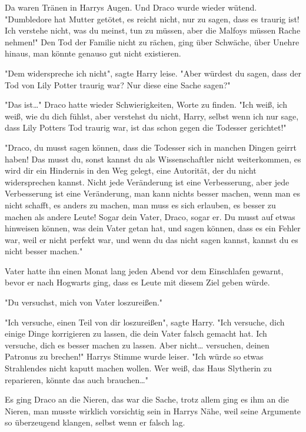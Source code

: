 {Da waren Tränen in Harrys Augen. Und Draco wurde wieder wütend. "Dumbledore hat Mutter getötet, es reicht nicht, nur zu sagen, dass es traurig ist! Ich verstehe nicht, was du meinst, tun zu müssen, aber die Malfoys müssen Rache nehmen!" Den Tod der Familie nicht zu rächen, ging über Schwäche, über Unehre hinaus, man könnte genauso gut nicht existieren.

"Dem widerspreche ich nicht", sagte Harry leise. "Aber würdest du sagen, dass der Tod von Lily Potter traurig war? Nur diese eine Sache sagen?"

"Das ist…" Draco hatte wieder Schwierigkeiten, Worte zu finden. "Ich weiß, ich weiß, wie du dich fühlst, aber verstehst du nicht, Harry, selbst wenn ich nur sage, dass Lily Potters Tod traurig war, ist das schon gegen die Todesser gerichtet!"

"Draco, du musst sagen können, dass die Todesser sich in manchen Dingen geirrt haben! Das musst du, sonst kannst du als Wissenschaftler nicht weiterkommen, es wird dir ein Hindernis in den Weg gelegt, eine Autorität, der du nicht widersprechen kannst. Nicht jede Veränderung ist eine Verbesserung, aber jede Verbesserung ist eine Veränderung, man kann nichts besser machen, wenn man es nicht schafft, es anders zu machen, man muss es sich erlauben, es besser zu machen als andere Leute! Sogar dein Vater, Draco, sogar er. Du musst auf etwas hinweisen können, was dein Vater getan hat, und sagen können, dass es ein Fehler war, weil er nicht perfekt war, und wenn du das nicht sagen kannst, kannst du es nicht besser machen."

Vater hatte ihn einen Monat lang jeden Abend vor dem Einschlafen gewarnt, bevor er nach Hogwarts ging, dass es Leute mit diesem Ziel geben würde.

"Du versuchst, mich von Vater loszureißen."

"Ich versuche, einen Teil von dir loszureißen", sagte Harry. "Ich versuche, dich einige Dinge korrigieren zu lassen, die dein Vater falsch gemacht hat. Ich versuche, dich es besser machen zu lassen. Aber nicht… versuchen, deinen Patronus zu brechen!" Harrys Stimme wurde leiser. "Ich würde so etwas Strahlendes nicht kaputt machen wollen. Wer weiß, das Haus Slytherin zu reparieren, könnte das auch brauchen…"

Es ging Draco an die Nieren, das war die Sache, trotz allem ging es ihm an die Nieren, man musste wirklich vorsichtig sein in Harrys Nähe, weil seine Argumente so überzeugend klangen, selbst wenn er falsch lag.

}
